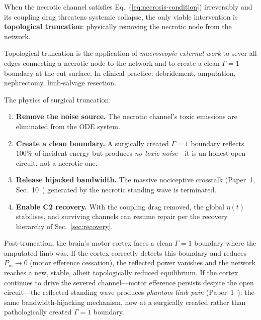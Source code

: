 \documentclass[aps,pre,twocolumn,superscriptaddress,floatfix]{revtex4-2}
\begin{document}
When the necrotic channel satisfies
Eq.~(\ref{eq:necrosis-condition}) irreversibly and
its coupling drag threatens systemic collapse, the
only viable intervention is \textbf{topological
truncation}: physically removing the necrotic node
from the network.

\begin{definition}
\label{def:truncation}
Topological truncation is the application of
\emph{macroscopic external work} to sever all edges
connecting a necrotic node to the network and
to create a clean $\Gamma = 1$ boundary at the
cut surface.
In clinical practice: debridement, amputation,
nephrectomy, limb-salvage resection.
\end{definition}

\noindent
The physics of surgical truncation:
\begin{enumerate}
  \item \textbf{Remove the noise source.}
    The necrotic channel's toxic emissions
    are eliminated from the ODE system.
  \item \textbf{Create a clean boundary.}
    A surgically created $\Gamma = 1$ boundary
    reflects $100\%$ of incident energy but
    produces \emph{no toxic noise}---it is an
    honest open circuit, not a necrotic one.
  \item \textbf{Release hijacked bandwidth.}
    The massive nociceptive crosstalk
    (Paper~1, Sec.~10~\cite{Paper1})
    generated by the necrotic standing wave is
    terminated.
  \item \textbf{Enable C2 recovery.}
    With the coupling drag removed, the global
    $\eta(t)$ stabilises, and surviving channels
    can resume repair per the recovery hierarchy
    of Sec.~\ref{sec:recovery}.
\end{enumerate}

Post-truncation, the brain's motor cortex faces a
clean $\Gamma = 1$ boundary where the amputated limb
was.
If the cortex correctly detects this boundary and
reduces $P_{\text{in}} \to 0$ (motor efference
cessation), the reflected power vanishes and the
network reaches a new, stable, albeit topologically
reduced equilibrium.
If the cortex continues to drive the severed
channel---motor efference persists despite the
open circuit---the reflected standing wave produces
\emph{phantom limb pain}
(Paper~1~\cite{Paper1}):
the same bandwidth-hijacking mechanism, now at a
surgically created rather than pathologically created
$\Gamma = 1$ boundary.
\end{document}
